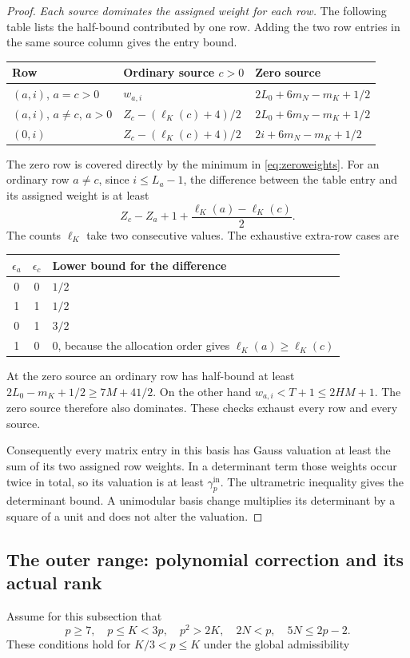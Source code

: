 \begin{proof}
\emph{Each source dominates the assigned weight for each row.}
The following table lists the half-bound contributed by one row. Adding
the two row entries in the same source column gives the entry bound.
\begin{center}
\begin{tabular}{lll}
\toprule
Row & Ordinary source $c>0$ & Zero source\\
\midrule
$(a,i)$, $a=c>0$ & $w_{a,i}$ & $2L_0+6m_N-m_K+1/2$\\
$(a,i)$, $a\ne c$, $a>0$ & $Z_c-(\ell_K(c)+4)/2$
                       & $2L_0+6m_N-m_K+1/2$\\
$(0,i)$ & $Z_c-(\ell_K(c)+4)/2$ & $2i+6m_N-m_K+1/2$\\
\bottomrule
\end{tabular}
\end{center}
The zero row is covered directly by the minimum in
\eqref{eq:zeroweights}. For an ordinary row $a\ne c$, since
$i\le L_a-1$, the difference between the table entry and its assigned
weight is at least
\[
 Z_c-Z_a+1+\frac{\ell_K(a)-\ell_K(c)}2.
\]
The counts $\ell_K$ take two consecutive values. The exhaustive extra-row
cases are
\begin{center}
\begin{tabular}{ccl}
\toprule
$\epsilon_a$ & $\epsilon_c$ & Lower bound for the difference\\
\midrule
0 & 0 & $1/2$\\
1 & 1 & $1/2$\\
0 & 1 & $3/2$\\
1 & 0 & $0$, because the allocation order gives $\ell_K(a)\ge\ell_K(c)$\\
\bottomrule
\end{tabular}
\end{center}
At the zero source an ordinary row has half-bound at least
$2L_0-m_K+1/2\ge7M+41/2$. On the other hand
$w_{a,i}<T+1\le2HM+1$. The zero source therefore also dominates.
These checks exhaust every row and every source.

Consequently every matrix entry in this basis has Gauss valuation at
least the sum of its two assigned row weights. In a determinant term
those weights occur twice in total, so its valuation is at least
$\gamma_p^{\mathrm{in}}$. The ultrametric inequality gives the determinant
bound. A unimodular basis change multiplies its determinant by a square
of a unit and does not alter the valuation.
\end{proof}

\subsection{The outer range: polynomial correction and its actual rank}
Assume for this subsection that
\begin{equation}\label{eq:outerhyp}
 p\ge7,\quad p\le K<3p,\quad p^2>2K,\quad
 2N<p,\quad5N\le2p-2.
\end{equation}
These conditions hold for $K/3<p\le K$ under the global admissibility
